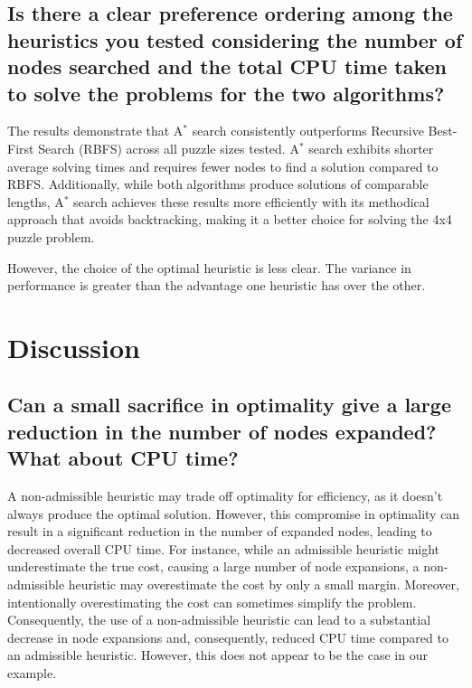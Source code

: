 \documentclass{article}
\begin{document}
 

\subsection{  Is there a clear preference ordering among the heuristics you tested considering the number of nodes searched and the total CPU time taken to solve the problems for the two algorithms?}
 
The results demonstrate that A$^*$ search consistently outperforms Recursive Best-First Search (RBFS) across all puzzle sizes tested. A$^*$ search exhibits shorter average solving times and requires fewer nodes to find a solution compared to RBFS. Additionally, while both algorithms produce solutions of comparable lengths, A$^*$ search achieves these results more efficiently with its methodical approach that avoids backtracking, making it a better choice for solving the 4x4 puzzle problem. 


However, the choice of the optimal heuristic is less clear. The variance in performance is greater than the advantage one heuristic has over the other. 

\section{Discussion}



\subsection{  Can a small sacrifice in optimality give a large reduction in the number of nodes expanded? What about CPU time?}

{A non-admissible heuristic may trade off optimality for efficiency, as it doesn't always produce the optimal solution. However, this compromise in optimality can result in a significant reduction in the number of expanded nodes, leading to decreased overall CPU time. For instance, while an admissible heuristic might underestimate the true cost, causing a large number of node expansions, a non-admissible heuristic may overestimate the cost by only a small margin. Moreover, intentionally overestimating the cost can sometimes simplify the problem. Consequently, the use of a non-admissible heuristic can lead to a substantial decrease in node expansions and, consequently, reduced CPU time compared to an admissible heuristic. However, this does not appear to be the case in our example.}
\end{document}
